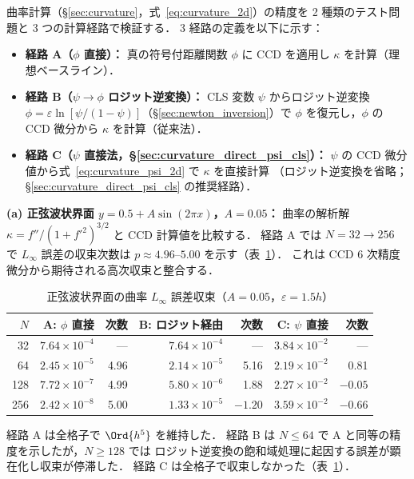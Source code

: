 曲率計算（§\ref{sec:curvature}，式~\eqref{eq:curvature_2d}）の精度を
2 種類のテスト問題と 3 つの計算経路で検証する．
3 経路の定義を以下に示す：
\begin{itemize}
  \item \textbf{経路 A（$\phi$ 直接）：}
        真の符号付距離関数 $\phi$ に CCD を適用し $\kappa$ を計算（理想ベースライン）．
  \item \textbf{経路 B（$\psi \to \phi$ ロジット逆変換）：}
        CLS 変数 $\psi$ からロジット逆変換
        $\phi = \varepsilon\ln[\psi/(1-\psi)]$（§\ref{sec:newton_inversion}）で
        $\phi$ を復元し，$\phi$ の CCD 微分から $\kappa$ を計算（従来法）．
  \item \textbf{経路 C（$\psi$ 直接法，§\ref{sec:curvature_direct_psi_cls}）：}
        $\psi$ の CCD 微分値から式~\eqref{eq:curvature_psi_2d} で $\kappa$ を直接計算
        （ロジット逆変換を省略；§\ref{sec:curvature_direct_psi_cls} の推奨経路）．
\end{itemize}

\textbf{(a) 正弦波状界面 $y = 0.5 + A\sin(2\pi x)$，$A = 0.05$：}
曲率の解析解 $\kappa = f''/(1+f'^2)^{3/2}$ と CCD 計算値を比較する．
経路 A では $N = 32 \to 256$ で $L_\infty$ 誤差の収束次数は
$p \approx 4.96$--$5.00$ を示す（表~\ref{tab:curvature_sinusoidal}）．
これは CCD 6 次精度微分から期待される高次収束と整合する．

\begin{table}[htbp]
\centering
\caption{正弦波状界面の曲率 $L_\infty$ 誤差収束（$A = 0.05$，$\varepsilon = 1.5h$）}
\label{tab:curvature_sinusoidal}
\begin{tabular}{rrrrrrr}
\toprule
$N$ & A: $\phi$ 直接 & 次数 & B: ロジット経由 & 次数 & C: $\psi$ 直接 & 次数 \\
\midrule
 32 & $7.64 \times 10^{-4}$ & ---  & $7.64 \times 10^{-4}$ & ---  & $3.84 \times 10^{-2}$ & ---  \\
 64 & $2.45 \times 10^{-5}$ & 4.96 & $2.14 \times 10^{-5}$ & 5.16 & $2.19 \times 10^{-2}$ & 0.81 \\
128 & $7.72 \times 10^{-7}$ & 4.99 & $5.80 \times 10^{-6}$ & 1.88 & $2.27 \times 10^{-2}$ & $-0.05$ \\
256 & $2.42 \times 10^{-8}$ & 5.00 & $1.33 \times 10^{-5}$ & $-1.20$ & $3.59 \times 10^{-2}$ & $-0.66$ \\
\bottomrule
\end{tabular}
\end{table}

経路 A は全格子で $\Ord{h^5}$ を維持した．
経路 B は $N \leq 64$ で A と同等の精度を示したが，$N \geq 128$ では
ロジット逆変換の飽和域処理に起因する誤差が顕在化し収束が停滞した．
経路 C は全格子で収束しなかった（表~\ref{tab:curvature_sinusoidal}）．

